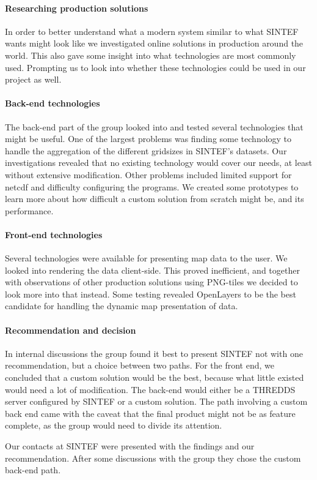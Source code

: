 \documentclass[11pt,a4paper,titlepage,oneside]{report}
\begin{document}
\paragraph{Researching production solutions}
In order to better understand what a modern system similar to what SINTEF wants might look like we investigated online solutions in production around the world. This also gave some insight into what technologies are most commonly used. Prompting us to look into whether these technologies could be used in our project as well.

\paragraph{Back-end technologies}
The \gls{back-end} part of the group looked into and tested several technologies that might be useful. One of the largest problems was finding some technology to handle the aggregation of the different gridsizes in SINTEF's datasets. Our investigations revealed that no existing technology would cover our needs, at least without extensive modification. Other problems included limited support for \gls{netcdf} and difficulty configuring the programs. We created some \glspl{prototype} to learn more about how difficult a custom solution from scratch might be, and its performance.

\paragraph{Front-end technologies}
Several technologies were available for presenting map data to the user. We looked into rendering the data client-side. This proved inefficient, and together with observations of other production solutions using \gls{PNG}-tiles we decided to look more into that instead. Some testing revealed OpenLayers to be the best candidate for handling the dynamic map presentation of data.

\paragraph{Recommendation and decision}
In internal discussions the group found it best to present SINTEF not with one recommendation, but a choice between two paths. For the front end, we concluded that a custom solution would be the best, because what little existed would need a lot of modification. The \gls{back-end} would either be a \gls{THREDDS} server configured by SINTEF or a custom solution. The path involving a custom back end came with the caveat that the final product might not be as feature complete, as the group would need to divide its attention.
\par Our contacts at SINTEF were presented with the findings and our recommendation. After some discussions with the group they chose the custom \gls{back-end} path.
\end{document}
